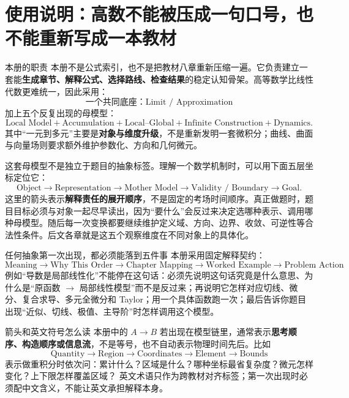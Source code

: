 \documentclass[11pt,a4paper,openany]{ctexbook}
\newcommand{\key}[1]{\textbf{\color{deep}#1}}
\begin{document}
\chapter*{使用说明：高数不能被压成一句口号，也不能重新写成一本教材}

\begin{corebox}{本册的职责}
本册不是公式索引，也不是把教材八章重新压缩一遍。它负责建立一套能\key{生成章节、解释公式、选择路线、检查结果}的稳定认知骨架。高等数学比线性代数更难统一，因此采用：
\[
\boxed{\text{一个共同底座：Limit / Approximation}}
\]
加上五个反复出现的母模型：
\[
\boxed{\text{Local Model}+\text{Accumulation}+\text{Local--Global}+\text{Infinite Construction}+\text{Dynamics}}.
\]
其中“一元到多元”主要是\key{对象与维度升级}，不是重新发明一套微积分；曲线、曲面与向量场则要求额外维护参数化、方向和几何微元。

这套母模型不是独立于题目的抽象标签。理解一个数学机制时，可以用下面五层坐标定位它：
\[
\boxed{\text{Object}\to\text{Representation}\to\text{Mother Model}\to\text{Validity / Boundary}\to\text{Goal}}.
\]
这里的箭头表示\key{解释责任的展开顺序}，不是固定的考场时间顺序。真正做题时，题目目标必须与对象一起尽早读出，因为“要什么”会反过来决定选哪种表示、调用哪种母模型。随后每一次变换都要继续维护定义域、方向、边界、收敛、可逆性等合法性条件。后文各章就是这五个观察维度在不同对象上的具体化。
\end{corebox}

\begin{methodbox}{任何抽象第一次出现，都必须能落到五件事}
本册采用固定解释契约：
\[
\boxed{\text{Meaning}\to\text{Why This Order}\to\text{Chapter Mapping}\to\text{Worked Example}\to\text{Problem Action}}.
\]
例如“导数是局部线性化”不能停在这句话：必须先说明这句话究竟是什么意思、为什么是“原函数 $\to$ 局部线性模型”而不是反过来；再说明它怎样对应切线、微分、复合求导、多元全微分和 Taylor；用一个具体函数跑一次；最后告诉你题目出现“近似、切线、极值、主导阶”时怎样调用这个模型。
\end{methodbox}

\begin{methodbox}{箭头和英文符号怎么读}
本册中的 $A\to B$ 若出现在模型链里，通常表示\key{思考顺序、构造顺序或信息流}，不是等号，也不自动表示物理时间先后。比如
\[
\text{Quantity}\to\text{Region}\to\text{Coordinates}\to\text{Element}\to\text{Bounds}
\]
表示做重积分时依次问：累计什么？区域是什么？哪种坐标最省复杂度？微元怎样变化？上下限怎样覆盖区域？
英文术语只作为跨教材对齐标签；第一次出现时必须配中文含义，不能让英文承担解释本身。
\end{methodbox}
\end{document}

